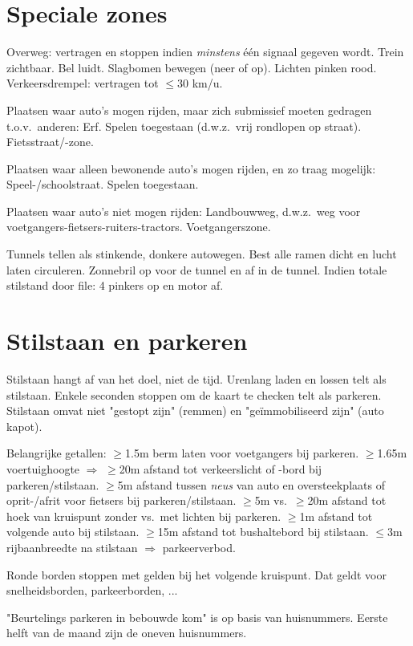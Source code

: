 \section{Speciale zones}
\begin{outline}
\1 Overweg: vertragen en stoppen indien \emph{minstens} één signaal gegeven wordt.
	\2 Trein zichtbaar.
	\2 Bel luidt.
	\2 Slagbomen bewegen (neer of op).
	\2 Lichten pinken rood.
\1 Verkeersdrempel: vertragen tot $\leq$30 km/u.

\1 Plaatsen waar auto's mogen rijden, maar zich submissief moeten gedragen t.o.v.\ anderen:
	\2 Erf. Spelen toegestaan (d.w.z.\ vrij rondlopen op straat).
	\2 Fietsstraat/-zone.
	
\1 Plaatsen waar alleen bewonende auto's mogen rijden, en zo traag mogelijk:
	\2 Speel-/schoolstraat. Spelen toegestaan.

\1 Plaatsen waar auto's niet mogen rijden:
	\2 Landbouwweg, d.w.z.\ weg voor voetgangers-fietsers-ruiters-tractors.
	\2 Voetgangerszone.
	
\1 Tunnels tellen als stinkende, donkere autowegen.
	\2 Best alle ramen dicht en lucht laten circuleren.
	\2 Zonnebril op voor de tunnel en af in de tunnel.
	\2 Indien totale stilstand door file: 4 pinkers op en motor af.
\end{outline}

\section{Stilstaan en parkeren}
\begin{outline}
\1 Stilstaan hangt af van het doel, niet de tijd.
	\2 Urenlang laden en lossen telt als stilstaan.
	\2 Enkele seconden stoppen om de kaart te checken telt als parkeren.
	\2 Stilstaan omvat niet "gestopt zijn" (remmen) en "geïmmobiliseerd zijn" (auto kapot).

\1 Belangrijke getallen:
	\2 $\geq$1.5m berm laten voor voetgangers bij parkeren.
	\2 $\geq$1.65m voertuighoogte $\Rightarrow$ $\geq$20m afstand tot verkeerslicht of -bord bij parkeren/stilstaan.
	\2 $\geq$5m afstand tussen \emph{neus} van auto en oversteekplaats of oprit-/afrit voor fietsers bij parkeren/stilstaan.
	\2 $\geq$5m vs.\ $\geq$20m afstand tot hoek van kruispunt zonder vs.\ met lichten bij parkeren.
	\2 $\geq$1m afstand tot volgende auto bij stilstaan.
	\2 $\geq$15m afstand tot bushaltebord bij stilstaan.
	\2 $\leq$3m rijbaanbreedte na stilstaan $\Rightarrow$ parkeerverbod.

\1 Ronde borden stoppen met gelden bij het volgende kruispunt.
	\2 Dat geldt voor snelheidsborden, parkeerborden, ...

\1 "Beurtelings parkeren in bebouwde kom" is op basis van huisnummers. Eerste helft van de maand zijn de oneven huisnummers.
\end{outline}

